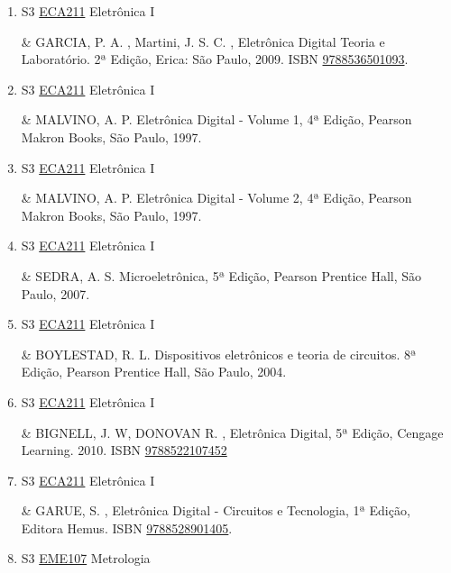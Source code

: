 \documentclass[12pt,a4paper]{book}
\begin{document}
\begin{enumerate}
& TOCCI, R.  J. , WIDNER, N.  S. , MOSS, G.  L. , Sistemas Digitais – Princípios e Aplicações, 10ª Edição, Pearson Prentice Hall: São Paulo, 2007.  ISBN \href{http://www.bn.br/site/pages/servicosProfissionais/agenciaISBN/isbnBusca/FbnBuscaISBNCatalogo.asp?pField=ISBN&pIntPagina=1&pISBN=76059226&nidbISBN=true&hidbISBN=true}{9788576059226}. 
 

 \item S3 \hyperref[PUD:ECA211]{ECA211} Eletrônica I

& GARCIA, P.  A. , Martini, J. S. C. , Eletrônica Digital Teoria e Laboratório.  2ª Edição, Erica: São Paulo, 2009.  ISBN \href{http://www.bn.br/site/pages/servicosProfissionais/agenciaISBN/isbnBusca/FbnBuscaISBNCatalogo.asp?pField=ISBN&pIntPagina=1&pISBN=36501093&nidbISBN=true&hidbISBN=true}{9788536501093}.
 \item S3 \hyperref[PUD:ECA211]{ECA211} Eletrônica I

& MALVINO, A.  P.  Eletrônica Digital - Volume 1, 4ª Edição, Pearson Makron Books, São Paulo, 1997. 
 

 \item S3 \hyperref[PUD:ECA211]{ECA211} Eletrônica I

& MALVINO, A.  P.  Eletrônica Digital - Volume 2, 4ª Edição, Pearson Makron Books, São Paulo, 1997. 
 

 \item S3 \hyperref[PUD:ECA211]{ECA211} Eletrônica I

& SEDRA, A. S.  Microeletrônica, 5ª Edição, Pearson Prentice Hall, São Paulo, 2007. 
 

 \item S3 \hyperref[PUD:ECA211]{ECA211} Eletrônica I

& BOYLESTAD, R. L.  Dispositivos eletrônicos e teoria de circuitos.  8ª Edição, Pearson Prentice Hall, São Paulo, 2004. 
 

 \item S3 \hyperref[PUD:ECA211]{ECA211} Eletrônica I

&  BIGNELL, J.  W, DONOVAN R. , Eletrônica Digital, 5ª Edição, Cengage Learning.  2010.   ISBN \href{http://www.bn.br/site/pages/servicosProfissionais/agenciaISBN/isbnBusca/FbnBuscaISBNCatalogo.asp?pField=ISBN&pIntPagina=1&pISBN=22107452&nidbISBN=true&hidbISBN=true}{9788522107452}
 

 \item S3 \hyperref[PUD:ECA211]{ECA211} Eletrônica I

&  GARUE, S. , Eletrônica Digital - Circuitos e Tecnologia, 1ª Edição, Editora Hemus.  ISBN \href{http://www.bn.br/site/pages/servicosProfissionais/agenciaISBN/isbnBusca/FbnBuscaISBNCatalogo.asp?pField=ISBN&pIntPagina=1&pISBN=28901405&nidbISBN=true&hidbISBN=true}{9788528901405}.
 \item S3 \hyperref[PUD:EME107]{EME107} Metrologia


\end{enumerate}
\end{document}
